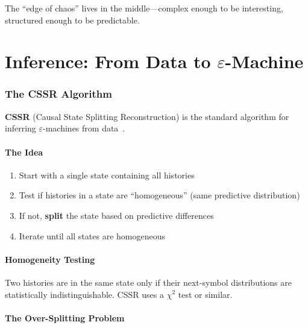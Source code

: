 \documentclass[11pt,a4paper]{article}
\theoremstyle{definition}
\theoremstyle{plain}
\newcommand{\eps}{\varepsilon}
\begin{document}
The ``edge of chaos'' lives in the middle---complex enough to be interesting, structured enough to be predictable.

\part{\texorpdfstring{Inference: From Data to $\eps$-Machine}{Inference: From Data to Epsilon-Machine}}

\section{The CSSR Algorithm}
\label{sec:cssr}

\textbf{CSSR} (Causal State Splitting Reconstruction) is the standard algorithm for inferring $\eps$-machines from data~\cite{shalizi2004algorithm}.

\subsection{The Idea}

\begin{enumerate}
    \item Start with a single state containing all histories
    \item Test if histories in a state are ``homogeneous'' (same predictive distribution)
    \item If not, \textbf{split} the state based on predictive differences
    \item Iterate until all states are homogeneous
\end{enumerate}

\subsection{Homogeneity Testing}

Two histories are in the same state only if their next-symbol distributions are statistically indistinguishable. CSSR uses a $\chi^2$ test or similar.

\subsection{The Over-Splitting Problem}
\end{document}
